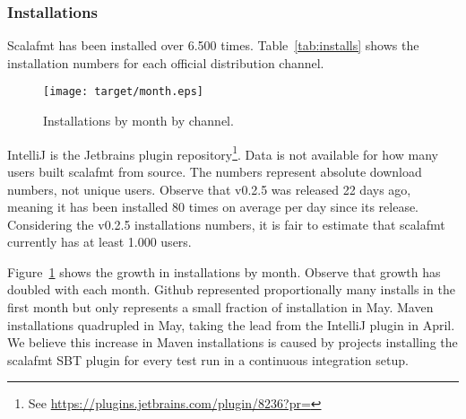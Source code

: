 \subsubsection{Installations}
Scalafmt has been installed over 6.500 times.
  Table~\ref{tab:installs} shows the installation numbers for each official distribution channel.
  \begin{figure}
    \CenterFloatBoxes
    \begin{floatrow}
      \ffigbox
      {\texttt{[image: target/month.eps]}}
      {\caption{Installations by month by channel.}\label{fig:installs}}
      \killfloatstyle
    \end{floatrow}
  \end{figure}
IntelliJ is the Jetbrains plugin repository\footnote{
  See \url{https://plugins.jetbrains.com/plugin/8236?pr=}
}.
Data is not available for how many users built scalafmt from source.
The numbers represent absolute download numbers, not unique users.
Observe that v0.2.5 was released 22 days ago, meaning it has been installed 80 times on average per day since its release.
Considering the v0.2.5 installations numbers, it is fair to estimate that scalafmt currently has at least 1.000 users.

Figure~\ref{fig:installs} shows the growth in installations by month.
Observe that growth has doubled with each month.
Github represented proportionally many installs in the first month but only represents a small fraction of installation in May.
Maven installations quadrupled in May, taking the lead from the IntelliJ plugin in April.
We believe this increase in Maven installations is caused by projects installing the scalafmt SBT plugin for every test run in a continuous integration setup.


